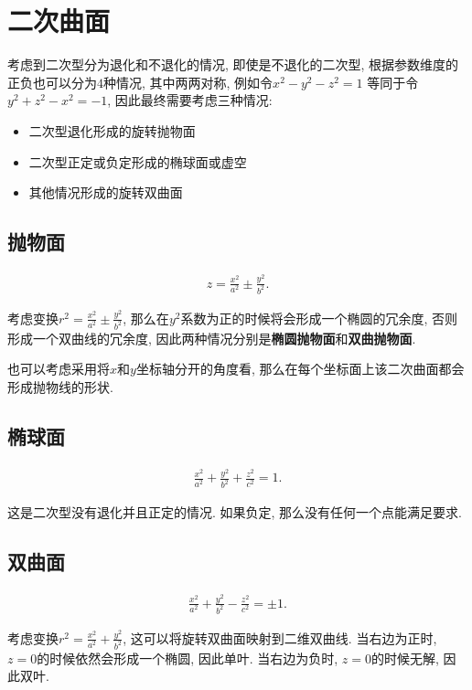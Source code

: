 \documentclass[UTF8,a4paper,11pt]{ctexart}
\begin{document}
  \section{二次曲面}
    考虑到二次型分为退化和不退化的情况,
    即使是不退化的二次型, 
    根据参数维度的正负也可以分为$4$种情况,
    其中两两对称, 例如令$x^{2}-y^{2}-z^{2}=1$
    等同于令$y^{2}+z^{2}-x^{2}=-1$,
    因此最终需要考虑三种情况:
    \begin{itemize}
      \item 二次型退化形成的旋转抛物面
      \item 二次型正定或负定形成的椭球面或虚空
      \item 其他情况形成的旋转双曲面
    \end{itemize}

    \subsection{抛物面}
      \[
      \begin{aligned}
        z=\frac{x^{2}}{a^{2}}\pm \frac{y^{2}}{b^{2}}
      .\end{aligned}
      \]
      
      考虑变换$r^{2}=\frac{x^{2}}{a^{2}}\pm \frac{y^{2}}{b^{2}}$,
      那么在$y^{2}$系数为正的时候将会形成一个椭圆的冗余度,
      否则形成一个双曲线的冗余度,
      因此两种情况分别是\textbf{椭圆抛物面}和\textbf{双曲抛物面}.

      也可以考虑采用将$x$和$y$坐标轴分开的角度看,
      那么在每个坐标面上该二次曲面都会形成抛物线的形状.
    \subsection{椭球面}
      \[
      \begin{aligned}
        \frac{x^{2}}{a^{2}}+\frac{y^{2}}{b^{2}}+\frac{z^{2}}{c^{2}}=1
      .\end{aligned}
      \]
      
      这是二次型没有退化并且正定的情况.
      如果负定, 那么没有任何一个点能满足要求.

    \subsection{双曲面}
      \[
      \begin{aligned}
        \frac{x^{2}}{a^{2}}+\frac{y^{2}}{b^{2}}-\frac{z^{2}}{c^{2}}=\pm 1
      .\end{aligned}
      \]
      
      考虑变换$r^{2}=\frac{x^{2}}{a^{2}}+\frac{y^{2}}{b^{2}}$,
      这可以将旋转双曲面映射到二维双曲线.
      当右边为正时, $z=0$的时候依然会形成一个椭圆, 因此单叶.
      当右边为负时, $z=0$的时候无解, 因此双叶.
\end{document}
